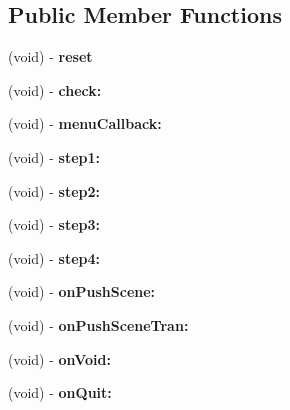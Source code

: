 \subsection*{Public Member Functions}
\begin{DoxyCompactItemize}
\item 
\hypertarget{interface_layer1_a8f788764e66c80723146d445d0147628}{(void) -\/ {\bfseries reset}}\label{interface_layer1_a8f788764e66c80723146d445d0147628}

\item 
\hypertarget{interface_layer1_a9814adf139a6fff776e53ce611c85015}{(void) -\/ {\bfseries check\-:}}\label{interface_layer1_a9814adf139a6fff776e53ce611c85015}

\item 
\hypertarget{interface_layer1_afb353c469ff0c1a96298bbb2d301f8f7}{(void) -\/ {\bfseries menu\-Callback\-:}}\label{interface_layer1_afb353c469ff0c1a96298bbb2d301f8f7}

\item 
\hypertarget{interface_layer1_a2ff36ad73c09f577ec587e722036a440}{(void) -\/ {\bfseries step1\-:}}\label{interface_layer1_a2ff36ad73c09f577ec587e722036a440}

\item 
\hypertarget{interface_layer1_a1bea5b1ccbce301239d842b72fbf13ab}{(void) -\/ {\bfseries step2\-:}}\label{interface_layer1_a1bea5b1ccbce301239d842b72fbf13ab}

\item 
\hypertarget{interface_layer1_a1f9925715346d085f8b63bc591c707f2}{(void) -\/ {\bfseries step3\-:}}\label{interface_layer1_a1f9925715346d085f8b63bc591c707f2}

\item 
\hypertarget{interface_layer1_a222a2e8982d6ad97fcef4f5acbc00dd8}{(void) -\/ {\bfseries step4\-:}}\label{interface_layer1_a222a2e8982d6ad97fcef4f5acbc00dd8}

\item 
\hypertarget{interface_layer1_addd32d410feaec6669a5164fdd7b05b7}{(void) -\/ {\bfseries on\-Push\-Scene\-:}}\label{interface_layer1_addd32d410feaec6669a5164fdd7b05b7}

\item 
\hypertarget{interface_layer1_ab98522decd60948405868a2380f8f9c5}{(void) -\/ {\bfseries on\-Push\-Scene\-Tran\-:}}\label{interface_layer1_ab98522decd60948405868a2380f8f9c5}

\item 
\hypertarget{interface_layer1_aea6193c86ff62b6d0161292075e111ab}{(void) -\/ {\bfseries on\-Void\-:}}\label{interface_layer1_aea6193c86ff62b6d0161292075e111ab}

\item 
\hypertarget{interface_layer1_a99ea63b903630ff9eaaa5845f8154faf}{(void) -\/ {\bfseries on\-Quit\-:}}\label{interface_layer1_a99ea63b903630ff9eaaa5845f8154faf}

\end{DoxyCompactItemize}
